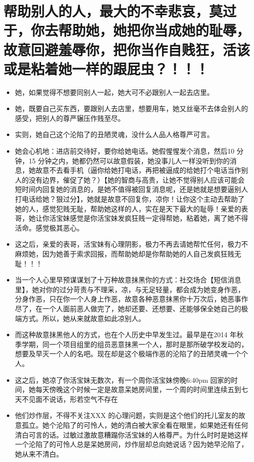 \documentclass[9pt, b5paper]{article}
\begin{document}
\section{帮助别人的人，最大的不幸悲哀，莫过于，你去帮助她，她把你当成她的耻辱，故意回避羞辱你，把你当作自贱狂，活该或是粘着她一样的跟屁虫？！！！}
\label{sec-5}
\begin{itemize}
\item 她，如果觉得不想要同别人一起，她大可不必跟别人一起去店里。
\item 她，既要自己买东西，要跟别人去店里，想要用车，她又丝毫不去体会别人的感受，把别人的尊严辗压作贱至尽。
\item 实则，她自己这个沦陷了的丑陋灵魂，没什么人品人格尊严可言。
\item 她会心机地：进店前交待好，要你给她电话。她假惺惺发个消息，然后10 分钟，15 分钟之内，她都仍然可以故意假装，她没事儿人一样没听到你的消息，她故意不去看手机（逼你给她打电话，再把被逼成的给她打个电话当作别人的没有边界，催促了她？）【她的智商与高贵，让她不觉得别人应该可能会短时间内回复她的消息的，是她不值得被回复消息呢，还是她就是想要逼别人打电话给她？狠过分】，她就是故意不回复你，凉你！让你这个主动去帮助了她的人，感觉犯贱无耻，帮助她这样的人，实在是天下最大的耻辱！亲爱的表哥，她让你活宝妹感觉是你活宝妹发疯狂贱一定得帮她，粘着她，离了她不得活命。感觉极其恶心。
\item 这之后，亲爱的表哥，活宝妹有心理阴影，极力不再去请她帮忙任何，极力不麻烦她，因为她善于索求回报，而帮助她却是你帮助她的人自己发疯狂贱无耻！！！

\item 当一个人心里早预谋谋划了十万种故意抹黑你的方式：社交场合【短信消息里】，她对你的过分苛责与不理采，凉，与无足轻量，都会成为她变身作恶，分身作恶，只在你一个人身上作恶，故意各种恶意抹黑你十万次后，她恶事作尽了，在一个人面前恶人做完了，她却还要、还想要、还能够保全她自己的极端方式。所以，她从来就故意如此凉别人。
\item 而这种故意抹黑他人的方式，也在个人历史中早发生过。最早是在2014 年秋季学期，同一个项目组里的组员恶意抹黑一个人，那时是那所破学校发动的，想要及早灭一个人的名吧。现在却是这个极端作恶的沦陷了的丑陋灵魂一个个人。

\item 这之后，她凉了你活宝妹无数次，有一个周你活宝妹傍晚6:40pm 回家的时间，她每天傍晚这个时候一定是故意呆她房间里，一个周的时间里连续五到七天不见面不说话，形若空气不存在
\item 他们炒作层，不得不关注XXX 的心理问题，实则是这个他们的托儿室友的故意孤立。她个沦陷了的可怜人，她的清白被大家全看在眼里，如果她还有任何清白可言的话。过敏过激故意糟蹋你活宝妹的人格尊严。为什么时时是她这样一个沦陷了的可怜人总是呆她房间，炒作层却总向她说话？因为她早沦陷了，她从来不清白。


\end{itemize}
\end{document}
